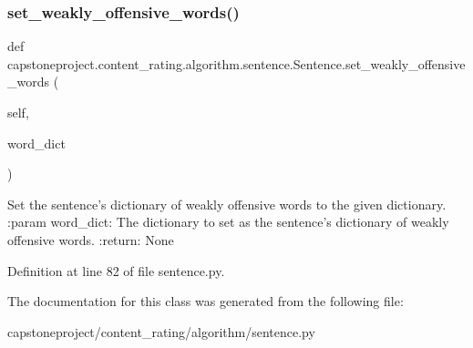 \subsubsection{\texorpdfstring{set\+\_\+weakly\+\_\+offensive\+\_\+words()}{set\_weakly\_offensive\_words()}}
{\footnotesize\ttfamily def capstoneproject.\+content\+\_\+rating.\+algorithm.\+sentence.\+Sentence.\+set\+\_\+weakly\+\_\+offensive\+\_\+words (\begin{DoxyParamCaption}\item[{}]{self,  }\item[{}]{word\+\_\+dict }\end{DoxyParamCaption})}

\begin{DoxyVerb}Set the sentence's dictionary of weakly offensive words to the given dictionary.
:param word_dict: The dictionary to set as the sentence's dictionary of weakly offensive words.
:return: None
\end{DoxyVerb}
 

Definition at line 82 of file sentence.\+py.



The documentation for this class was generated from the following file\+:\begin{DoxyCompactItemize}
\item 
capstoneproject/content\+\_\+rating/algorithm/sentence.\+py\end{DoxyCompactItemize}

